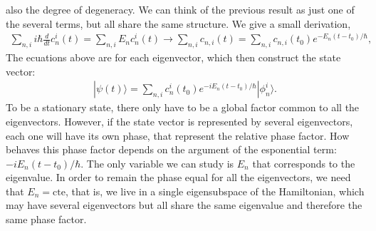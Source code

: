 \documentclass[letterpaper,11pt,twoside]{article}
\newcommand{\ket}[1]{|#1\rangle}
\begin{document}
\begin{enumerate}[itemsep=0pt,topsep=0pt,label=\alph*)]
  also the degree of degeneracy. We can think of the previous result as just one of the several terms, but all share the same structure.
  We give a small derivation,
  \begin{align*}
    \sum_{n,i}i\hbar\frac{d}{dt}c^i_n(t)=\sum_{n,i}E_nc^i_n(t)\longrightarrow\sum_{n,i}c_{n,i}(t)=\sum_{n,i}c_{n,i}(t_0)e^{-E_n(t-t_0)/\hbar},
  \end{align*} 
  The ecuations above are for each eigenvector, which then construct the state vector:
  \begin{align*}
    \ket{\psi(t)}=\sum_{n,i}c_n^i(t_0)e^{-iE_n(t-t_0)/\hbar}\ket{\phi_n^i}.
  \end{align*} 
  To be a stationary state, there only have to be a global factor common to all the eigenvectors. However, if the state vector is represented by several eigenvectors,
  each one will have its own phase, that represent the relative phase factor. How behaves this phase factor depends on the argument of the esponential term:
  $-iE_n(t-t_0)/\hbar$. The only variable we can study is $E_n$ that corresponds to the eigenvalue. In order to remain the phase equal for all the eigenvectors, 
  we need that $E_n=\text{cte}$, that is, we live in a single eigensubspace of the Hamiltonian, which may have several eigenvectors but all share the same eigenvalue and therefore 
  the same phase factor. 
\end{enumerate}
\end{document}
